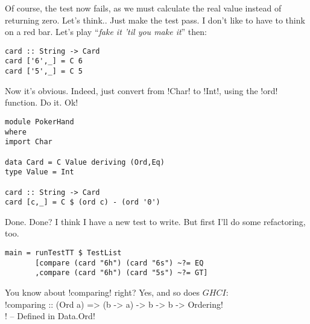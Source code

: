 \failure Of course, the test now fails, as we must calculate the real value instead of returning zero. Let's think..
\lhN \failure Just make the test pass. I don't like to have to think on a red bar.
\lhA \failure Let's play ``\emph{fake it 'til you make it}'' then:
\begin{lstlisting}[frame=single]
card :: String -> Card
card ['6',_] = C 6
card ['5',_] = C 5 
\end{lstlisting}
\success Now it's obvious.
\lhN \success Indeed, just convert from \il!Char! to \il!Int!, using the \il!ord! function. Do it.
\lhA \success Ok!
\begin{lstlisting}[frame=single]
module PokerHand
where
import Char

data Card = C Value deriving (Ord,Eq)
type Value = Int

card :: String -> Card
card [c,_] = C $ (ord c) - (ord '0')
\end{lstlisting} %
\success Done.
\lhN Done? I think I have a new test to write. But first I'll do some refactoring, too.
\begin{lstlisting}[frame=single]
main = runTestTT $ TestList 
       [compare (card "6h") (card "6s") ~?= EQ
       ,compare (card "6h") (card "5s") ~?= GT]
\end{lstlisting} %
You know about \il!comparing! right?
\lhA Yes, and so does $GHCI$: \\

\il!comparing :: (Ord a) => (b -> a) -> b -> b -> Ordering! \\
\il! -- Defined in Data.Ord! \\


